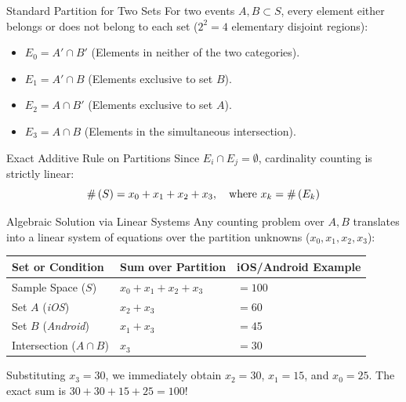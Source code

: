 \documentclass[10pt,aspectratio=169]{beamer}
\begin{document}
\begin{frame}{Standard Partition for Two Sets}
  For two events $A, B \subset S$, every element either belongs or does not belong to each set ($2^2 = 4$ elementary disjoint regions):
  
  \vspace{0.3em}
  \begin{itemize}
    \item $E_0 = A' \cap B'$ \quad (Elements in neither of the two categories). \pause
    \item $E_1 = A' \cap B$ \quad (Elements exclusive to set $B$). \pause
    \item $E_2 = A \cap B'$ \quad (Elements exclusive to set $A$). \pause
    \item $E_3 = A \cap B$ \quad (Elements in the simultaneous intersection).
  \end{itemize}
  
  \vspace{0.3em}
  \pause
  \begin{block}{Exact Additive Rule on Partitions}
    Since $E_i \cap E_j = \emptyset$, cardinality counting is strictly linear:
    \[ \#\left( S \right) = x_0 + x_1 + x_2 + x_3, \quad \text{where } x_k = \#\left( E_k \right) \]
  \end{block}
\end{frame}

\begin{frame}{Algebraic Solution via Linear Systems}
  Any counting problem over $A, B$ translates into a linear system of equations over the partition unknowns ($x_0, x_1, x_2, x_3$):
  
  \vspace{0.3em}
  \begin{center}
    \begin{tabular}{l l l}
      \textbf{Set or Condition} & \textbf{Sum over Partition} & \textbf{iOS/Android Example} \\
      \hline
      Sample Space ($S$) & $x_0 + x_1 + x_2 + x_3$ & $= 100$ \\
      Set $A$ (\emph{iOS}) & $x_2 + x_3$ & $= 60$ \\
      Set $B$ (\emph{Android}) & $x_1 + x_3$ & $= 45$ \\
      Intersection ($A \cap B$) & $x_3$ & $= 30$ \\
      \hline
    \end{tabular}
  \end{center}
  
  \vspace{0.3em}
  \pause
  Substituting $x_3 = 30$, we immediately obtain $x_2 = 30$, $x_1 = 15$, and $x_0 = 25$. The exact sum is $30 + 30 + 15 + 25 = 100$!
\end{frame}
\end{document}
